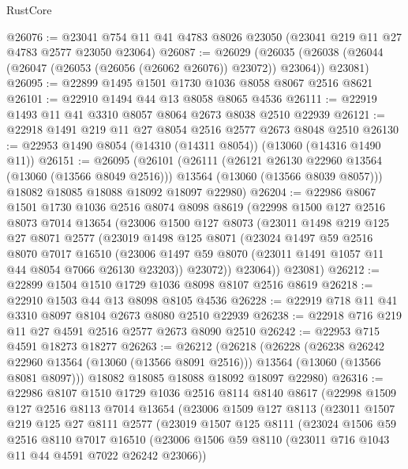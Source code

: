 \begin{lexlean}{RustCore}
\begin{coremodule}
@26076 := @23041 @754 @11 @41 @4783 @8026 @23050 (@23041 @219 @11 @27 @4783 @2577 @23050 @23064)
@26087 := @26029
    (@26035 (@26038 (@26044 (@26047 (@26053 (@26056 (@26062 @26076)) @23072)) @23064)) @23081)
@26095 := @22899 @1495 @1501 @1730 @1036 @8058 @8067 @2516 @8621
@26101 := @22910 @1494 @44 @13 @8058 @8065 @4536
@26111 := @22919 @1493 @11 @41 @3310 @8057 @8064 @2673 @8038 @2510 @22939
@26121 := @22918 @1491 @219 @11 @27 @8054 @2516 @2577 @2673 @8048 @2510
@26130 := @22953 @1490 @8054 (@14310 (@14311 @8054)) (@13060 (@14316 @1490 @11))
@26151 := @26095
    (@26101
      (@26111
        (@26121 @26130 @22960 @13564 (@13060 (@13566 @8049 @2516)))
        @13564
        (@13060 (@13566 @8039 @8057)))
      @18082
      @18085
      @18088
      @18092
      @18097
      @22980)
@26204 := @22986
    @8067
    @1501
    @1730
    @1036
    @2516
    @8074
    @8098
    @8619
    (@22998
      @1500
      @127
      @2516
      @8073
      @7014
      @13654
      (@23006
        @1500
        @127
        @8073
        (@23011
          @1498
          @219
          @125
          @27
          @8071
          @2577
          (@23019
            @1498
            @125
            @8071
            (@23024
              @1497
              @59
              @2516
              @8070
              @7017
              @16510
              (@23006 @1497 @59 @8070 (@23011 @1491 @1057 @11 @44 @8054 @7066 @26130 @23203))
              @23072))
          @23064))
      @23081)
@26212 := @22899 @1504 @1510 @1729 @1036 @8098 @8107 @2516 @8619
@26218 := @22910 @1503 @44 @13 @8098 @8105 @4536
@26228 := @22919 @718 @11 @41 @3310 @8097 @8104 @2673 @8080 @2510 @22939
@26238 := @22918 @716 @219 @11 @27 @4591 @2516 @2577 @2673 @8090 @2510
@26242 := @22953 @715 @4591 @18273 @18277
@26263 := @26212
    (@26218
      (@26228
        (@26238 @26242 @22960 @13564 (@13060 (@13566 @8091 @2516)))
        @13564
        (@13060 (@13566 @8081 @8097)))
      @18082
      @18085
      @18088
      @18092
      @18097
      @22980)
@26316 := @22986
    @8107
    @1510
    @1729
    @1036
    @2516
    @8114
    @8140
    @8617
    (@22998
      @1509
      @127
      @2516
      @8113
      @7014
      @13654
      (@23006
        @1509
        @127
        @8113
        (@23011
          @1507
          @219
          @125
          @27
          @8111
          @2577
          (@23019
            @1507
            @125
            @8111
            (@23024
              @1506
              @59
              @2516
              @8110
              @7017
              @16510
              (@23006 @1506 @59 @8110 (@23011 @716 @1043 @11 @44 @4591 @7022 @26242 @23066))

\end{coremodule}
\end{lexlean}
